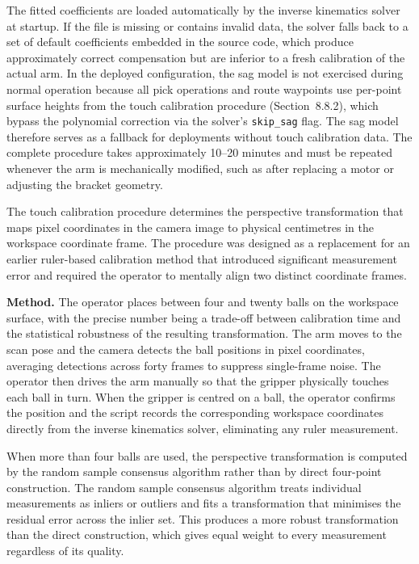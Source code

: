 The fitted coefficients are loaded automatically by the inverse 
kinematics solver at startup. If the file is missing or contains 
invalid data, the solver falls back to a set of default 
coefficients embedded in the source code, which produce 
approximately correct compensation but are inferior to a fresh 
calibration of the actual arm. In the deployed configuration, 
the sag model is not exercised during normal operation because 
all pick operations and route waypoints use per-point surface 
heights from the touch calibration procedure 
(Section~8.8.2), which bypass the polynomial correction via the 
solver's \texttt{skip\_sag} flag. The sag model therefore serves 
as a fallback for deployments without touch calibration data. 
The complete procedure takes approximately 10--20 minutes and 
must be repeated whenever the arm is mechanically modified, such 
as after replacing a motor or adjusting the bracket geometry.


The touch calibration procedure determines the perspective 
transformation that maps pixel coordinates in the camera image 
to physical centimetres in the workspace coordinate frame. The 
procedure was designed as a replacement for an earlier 
ruler-based calibration method that introduced significant 
measurement error and required the operator to mentally align 
two distinct coordinate frames.

\textbf{Method.} The operator places between four and twenty 
balls on the workspace surface, with the precise number being a 
trade-off between calibration time and the statistical 
robustness of the resulting transformation. The arm moves to 
the scan pose and the camera detects the ball positions in 
pixel coordinates, averaging detections across forty frames to 
suppress single-frame noise. The operator then drives the arm 
manually so that the gripper physically touches each ball in 
turn. When the gripper is centred on a ball, the operator 
confirms the position and the script records the corresponding 
workspace coordinates directly from the inverse kinematics 
solver, eliminating any ruler measurement.

When more than four balls are used, the perspective 
transformation is computed by the random sample consensus 
algorithm \cite{fischler1981} rather than by direct 
four-point construction. The random sample consensus algorithm 
treats individual measurements as inliers or outliers and fits 
a transformation that minimises the residual error across the 
inlier set. This produces a more robust transformation than 
the direct construction, which gives equal weight to every 
measurement regardless of its quality.

